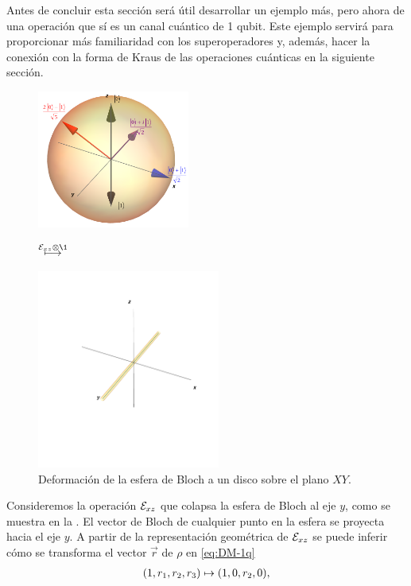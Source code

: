 Antes de concluir esta sección será útil desarrollar un ejemplo más, 
pero ahora de una operación que sí es un canal cuántico de 1 qubit. Este 
ejemplo servirá para proporcionar más familiaridad con  
los superoperadores y, además, hacer la conexión con 
la forma de Kraus de las operaciones cuánticas en la siguiente sección.

\begin{figure} %
    \centering
    \begin{minipage}{.4\textwidth}
        \centering
        \includegraphics[width=5cm]
        {img-congreso/bloch.png}
    \end{minipage}
    $\stackrel{\E_{xz}\otimes\1 \vspace{1cm}}{\longmapsto}$
    \begin{minipage}{0.4\textwidth}
        \centering
        \includegraphics[width=6cm]
        {img-congreso/lineY}
    \end{minipage}
    \caption{Deformación de la esfera de Bloch a un disco sobre el plano $XY$.}
    \label{fig:QC-ex2}
\end{figure} %
Consideremos la operación $\mathcal{E}_{xz}$ que colapsa la esfera de Bloch
al eje $y$, como se muestra en la . El vector de 
Bloch de cualquier punto en la esfera se proyecta hacia el eje $y$.
A partir de la representación geométrica de $\mathcal{E}_{xz}$ 
se puede inferir cómo se transforma el vector $\vec{r}$
de $\rho$ en \eqref{eq:DM-1q}
\begin{align}
\qty(1,r_1,r_2,r_3)\mapsto\qty(1,0,r_2,0),
\label{eq:Bloch-vec-mapToY}
\end{align}

